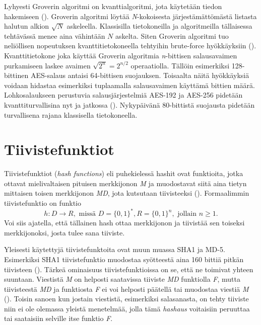  Lyhyesti Groverin algoritmi on kvanttialgoritmi, jota käytetään tiedon hakemiseen (\cite{hayward2008quantum}). Groverin algoritmi löytää \emph{N}-kokoisesta järjestämättömästä listasta halutun alkion $\sqrt{N}$ askeleella. Klassisilla tietokoneilla ja algoritmeilla tällaisessa tehtävässä menee aina vähintään $N$ askelta. Siten Groverin algoritmi tuo neliöllisen nopeutuksen kvanttitietokoneella tehtyihin brute-force hyökkäyksiin (\cite{mavroeidis2018impact}). Kvanttitietokone joka käyttää Groverin algoritmia \emph{n}-bittisen salausavaimen purkamiseen laskee avaimen $\sqrt{2^{n}} = 2^{n/2}$ operaatiolla. Tällöin esimerkiksi 128-bittinen AES-salaus antaisi 64-bittisen suojauksen. Toisaalta näitä hyökkäyksiä voidaan hidastaa esimerkiksi tuplaamalla salausavaimen käyttämä bittien määrä. Lohkosalaukseen perustuvia salausjärjestelmiä AES-192 ja AES-256 pidetään kvanttiturvallisina nyt ja jatkossa (\cite{mavroeidis2018impact}). Nykypäivänä 80-bittistä suojausta pidetään turvallisena rajana klassisella tietokoneella.
 
 \section{Tiivistefunktiot}
 Tiivistefunktiot (\emph{hash functions}) eli puhekielessä hashit  ovat funktioita, jotka ottavat mielivaltaisen pituisen merkkijonon \emph{M} ja muodostavat siitä aina tietyn mittaisen toisen merkkijonon \emph{MD}, jota kutsutaan tiivisteeksi (\cite{sobti2012cryptographic}). Formaalimmin tiivistefunktio on funktio
 \[h: D \to R, \text{ missä } D = \big\{0,1\big\}^{*}, R = \big\{0,1\big\}^{n}, \text{ jollain } n \geq 1.\] Voi siis ajatella, että tällainen hash ottaa merkkijonon ja tiivistää sen toiseksi merkkijonoksi, josta tulee sana tiiviste.
 
 Yleisesti käytettyjä tiivistefunktoita ovat muun muassa SHA1 ja MD-5. Esimerkiksi SHA1 tiivistefunktio muodostaa syötteestä aina 160 bittiä pitkän tiivisteen (\cite{bellare2005introduction}). Tärkeä ominaisuus tiivistefunktioissa on se, että ne toimivat yhteen suuntaan. Viestistä \emph{M} on helposti saatavissa tiiviste \emph{MD} funktiolla \emph{F}, mutta tiivisteestä \emph{MD} ja funktiosta \emph{F} ei voi helposti päätellä tai muodostaa viestiä \emph{M} (\cite{bakhtiari1995cryptographic}). Toisin sanoen kun jostain viestistä, esimerkiksi salasanasta, on tehty tiiviste niin ei ole olemassa yleistä menetelmää, jolla tämä \emph{hashaus} voitaisiin peruuttaa tai saataisiin selville itse funktio \emph{F}.
 
